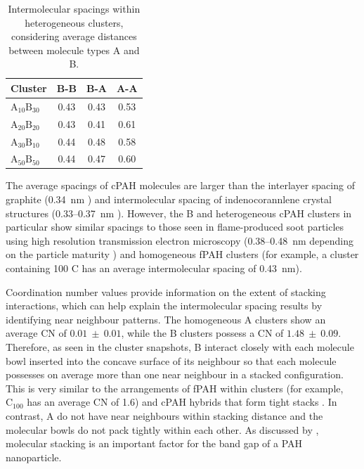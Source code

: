 %
\begin{table}[thb]
\centering
\caption{Intermolecular spacings within heterogeneous clusters, considering average distances between molecule types A and B.}
\label{table:mixedintermolecdists}
\begin{tabular}{lccc}
\hline
Cluster & B-B & B-A & A-A \\ \hline
$\text{A}_{\text{10}}\text{B}_{\text{30}}$ & 0.43 & 0.43 & 0.53 \\
$\text{A}_{\text{20}}\text{B}_{\text{20}}$ & 0.43 & 0.41 & 0.61 \\
$\text{A}_{\text{30}}\text{B}_{\text{10}}$ & 0.44 & 0.48 & 0.58 \\
$\text{A}_{\text{50}}\text{B}_{\text{50}}$ & 0.44 & 0.47 & 0.60 \\
\hline
\end{tabular}
\end{table}

The average spacings of cPAH molecules are larger than the interlayer spacing of graphite (0.34~nm \cite{franklin1951structure}) and intermolecular spacing of indenocorannlene crystal structures (0.33--0.37~nm \cite{Filatov2010}). However, the B and heterogeneous cPAH clusters in particular show similar spacings to those seen in flame-produced soot particles using high resolution transmission electron microscopy (0.38--0.48~nm depending on the particle maturity \cite{botero2019internal,apicella2015soot}) and homogeneous fPAH clusters (for example, a cluster containing 100 C \cite{chen2014phase} has an average intermolecular spacing of 0.43~nm). 

Coordination number values provide information on the extent of stacking interactions, which can help explain the intermolecular spacing results by identifying near neighbour patterns. The homogeneous A clusters show an average CN of $0.01~\pm~0.01$, while the B clusters possess a CN of $1.48~\pm~0.09$. Therefore, as seen in the cluster snapshots, B interact closely with each molecule bowl inserted into the concave surface of its neighbour so that each molecule possesses on average more than one near neighbour in a stacked configuration. This is very similar to the arrangements of fPAH within clusters (for example, $\text{C}_{\text{100}}$ has an average CN of 1.6) \cite{chen2014size} and cPAH hybrids that form tight stacks \cite{dubceac2018self}. In contrast, A do not have near neighbours within stacking distance and the molecular bowls do not pack tightly within each other. As discussed by \citet{liu2019flame}, molecular stacking is an important factor for the band gap of a PAH nanoparticle.

